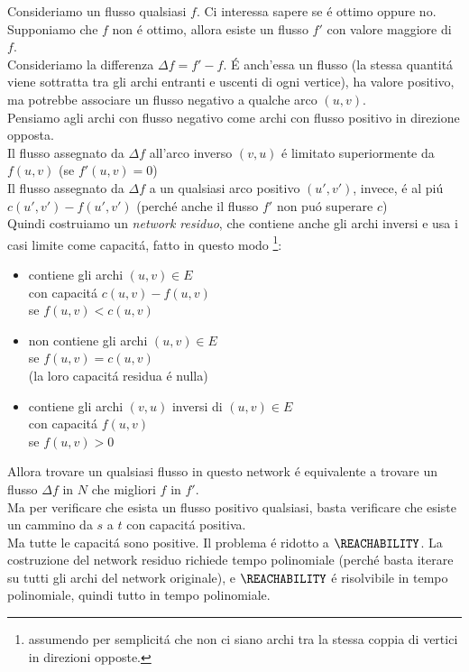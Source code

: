 Consideriamo un flusso qualsiasi $f$. Ci interessa sapere se é ottimo oppure no. \\
Supponiamo che $f$ non é ottimo, allora esiste un flusso $f'$ con valore maggiore di $f$. \\
Consideriamo la differenza $\Delta f = f' - f$. É anch'essa un flusso 
(la stessa quantitá viene sottratta tra gli archi entranti e uscenti di ogni vertice), 
ha valore positivo, ma potrebbe associare un flusso negativo a qualche arco $(u,v)$. \\
Pensiamo agli archi con flusso negativo come archi con flusso positivo in direzione opposta. \\
Il flusso assegnato da $\Delta f$ all'arco inverso $(v,u)$ é limitato superiormente da $f(u,v)$ 
(se $f'(u,v) = 0$) \\
Il flusso assegnato da $\Delta f$ a un qualsiasi arco positivo $(u', v')$, invece, é al piú $c(u', v') - f(u', v')$
(perché anche il flusso $f'$ non puó superare $c$) \\
Quindi costruiamo un \textit{network residuo}, 
che contiene anche gli archi inversi e usa i casi limite come capacitá,
fatto in questo modo
\footnote{assumendo per semplicitá che non ci siano archi 
tra la stessa coppia di vertici in direzioni opposte.}:
\begin{itemize}
	\item contiene gli archi $(u,v) \in E$ \\ 
    con capacitá $c(u,v) - f(u,v)$ \\
    se $f(u,v) < c(u,v)$
	\item non contiene gli archi $(u,v) \in E$ \\
    se $f(u, v) = c(u, v)$ \\
    (la loro capacitá residua é nulla)
	\item contiene gli archi $(v,u)$ inversi di $(u,v) \in E$ \\
    con capacitá $f(u,v)$ \\
    se $f(u,v) > 0$
\end{itemize}
Allora trovare un qualsiasi flusso in questo network é equivalente a trovare 
un flusso $\Delta f$ in $N$ che migliori $f$ in $f'$. \\
Ma per verificare che esista un flusso positivo qualsiasi, basta verificare 
che esiste un cammino da $s$ a $t$ con capacitá positiva. \\
Ma tutte le capacitá sono positive. Il problema é ridotto a $\REACHABILITY$.
La costruzione del network residuo richiede tempo polinomiale
(perché basta iterare su tutti gli archi del network originale), 
e $\REACHABILITY$ é risolvibile in tempo polinomiale, 
quindi tutto in tempo polinomiale.

